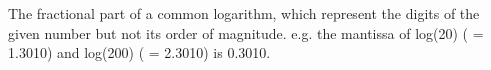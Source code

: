 The fractional part of a common logarithm, which represent the digits
of the given number but not its order of magnitude.
e.g. the mantissa of log(20) ( = 1.3010)  and  log(200) ( = 2.3010) is 0.3010.
